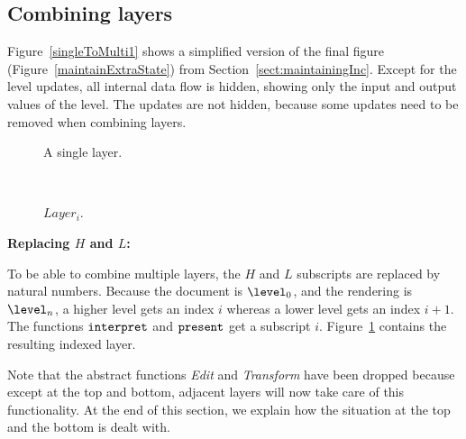 \subsection{Combining layers}

Figure~\ref{singleToMulti1} shows a simplified version of the final figure (Figure~\ref{maintainExtraState}) from Section~\ref{sect:maintainingInc}. Except for the level updates, all internal data flow is hidden, showing only the input and output values of the level. The updates are not hidden, because some updates need to be removed when combining layers.

\begin{figure}[h]
  \hfill
  \begin{minipage}[b]{.45\textwidth}
    \begin{center}  
      \caption{A single layer.} \label{singleToMulti1}
    \end{center}
  \end{minipage}
  \hfill
  \begin{minipage}[b]{.45\textwidth}
    \begin{center}  
      \\ \vspace{0.765cm}
      \caption{$Layer_i$.} \label{singleToMulti2}
    \end{center}
  \end{minipage}
  \hfill
\end{figure}

\bigskip
{\bf Replacing $H$ and $L$:}

To be able to combine multiple layers, the $H$ and $L$ subscripts are replaced by natural numbers. Because the document is $\level_0$, and the rendering is $\level_n$, a higher level gets an index $i$ whereas a lower level gets an index $i+1$. The functions ${\tt interpret}$ and ${\tt present}$ get a subscript $i$. Figure~\ref{singleToMulti2} contains the resulting indexed layer. 

Note that the abstract functions {\em Edit} and {\em Transform} have been dropped because except at the top and bottom, adjacent layers will now take care of this functionality. At the end of this section, we explain how the situation at the top and the bottom is dealt with.

